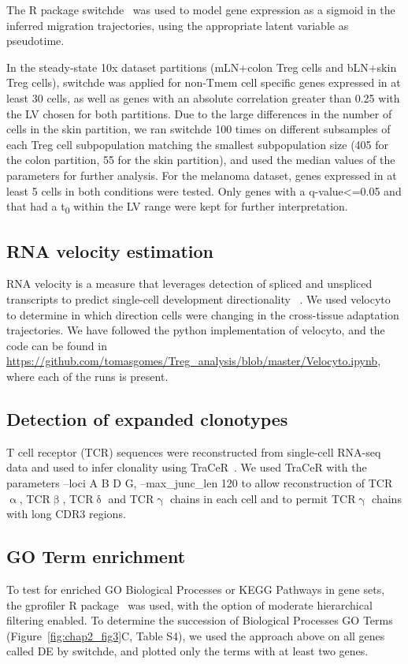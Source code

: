 The R package switchde~\citep{Campbell2017-cf} was used to model gene expression as a sigmoid in the inferred migration trajectories, using the appropriate latent variable as pseudotime. 

In the steady-state 10x dataset partitions (mLN+colon Treg cells and bLN+skin Treg cells), switchde was applied for non-Tmem cell specific genes expressed in at least 30 cells, as well as genes with an absolute correlation greater than 0.25 with the LV chosen for both partitions. Due to the large differences in the number of cells in the skin partition, we ran switchde 100 times on different subsamples of each Treg cell subpopulation matching the smallest subpopulation size (405 for the colon partition, 55 for the skin partition), and used the median values of the parameters for further analysis. For the melanoma dataset, genes expressed in at least 5 cells in both conditions were tested. Only genes with a q-value<=0.05 and that had a t\textsubscript{0} within the LV range were kept for further interpretation.

\subsection{RNA velocity estimation}
RNA velocity is a measure that leverages detection of spliced and unspliced transcripts to predict single-cell development directionality ~\citep{manno_rna_2018}. We used velocyto to determine in which direction cells were changing in the cross-tissue adaptation trajectories. We have followed the python implementation of velocyto, and the code can be found in \url{https://github.com/tomasgomes/Treg\_analysis/blob/master/Velocyto.ipynb}, where each of the runs is present.

\subsection{Detection of expanded clonotypes}
T cell receptor (TCR) sequences were reconstructed from single-cell RNA-seq data and used to infer clonality using TraCeR~\citep{stubbington_t_2016}. We used TraCeR with the parameters --loci A B D G, --max\_junc\_len 120 to allow reconstruction of TCR${\upalpha}$, TCR${\upbeta}$, TCR${\updelta}$ and TCR${\upgamma}$ chains in each cell and to permit TCR${\upgamma}$ chains with long CDR3 regions. 

\subsection{GO Term enrichment}
To test for enriched GO Biological Processes or KEGG Pathways in gene sets, the gprofiler R package~\citep{Reimand2016-fj} was used, with the option of moderate hierarchical filtering enabled.
To determine the succession of Biological Processes GO Terms (Figure~\ref{fig:chap2_fig3}C, Table S4), we used the approach above on all genes called DE by switchde, and plotted only the terms with at least two genes.

